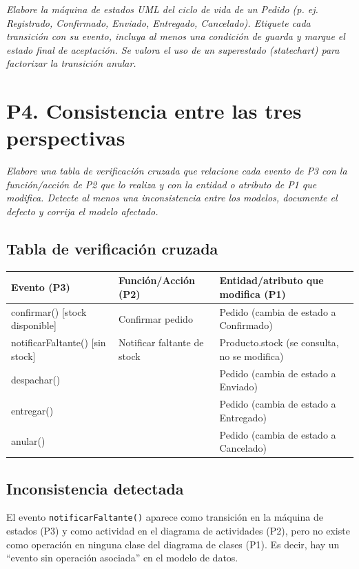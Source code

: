 \documentclass[11pt]{article}
\begin{document}
\textit{Elabore la máquina de estados UML del ciclo de vida de un Pedido (p. ej. Registrado, Confirmado, Enviado, Entregado, Cancelado). Etiquete cada transición con su evento, incluya al menos una condición de guarda y marque el estado final de aceptación. Se valora el uso de un superestado (statechart) para factorizar la transición anular.}

\vspace{1cm}

\section*{P4. Consistencia entre las tres perspectivas}

\textit{Elabore una tabla de verificación cruzada que relacione cada evento de P3 con la función/acción de P2 que lo realiza y con la entidad o atributo de P1 que modifica. Detecte al menos una inconsistencia entre los modelos, documente el defecto y corrija el modelo afectado.}

\subsection*{Tabla de verificación cruzada}

\begin{center}
\small
\begin{tabular}{|p{3.7cm}|p{4.5cm}|p{5.3cm}|}
\hline
\textbf{Evento (P3)} & \textbf{Función/Acción (P2)} & \textbf{Entidad/atributo que modifica (P1)} \\
\hline
confirmar() [stock disponible] & Confirmar pedido & Pedido (cambia de estado a Confirmado) \\
\hline
notificarFaltante() [sin stock] & Notificar faltante de stock & Producto.stock (se consulta, no se modifica) \\
\hline
despachar() &  & Pedido (cambia de estado a Enviado) \\
\hline
entregar() &  & Pedido (cambia de estado a Entregado) \\
\hline
anular() &  & Pedido (cambia de estado a Cancelado) \\
\hline
\end{tabular}
\end{center}

\subsection*{Inconsistencia detectada}
El evento \texttt{notificarFaltante()} aparece como transición en la máquina de estados (P3) y como actividad en el diagrama de actividades (P2), pero no existe como operación en ninguna clase del diagrama de clases (P1). Es decir, hay un ``evento sin operación asociada'' en el modelo de datos.
\end{document}
